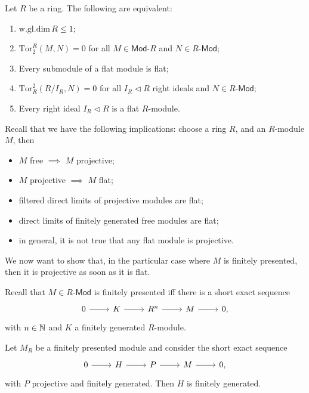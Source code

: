 \begin{prop}
	Let $R$ be a ring. The following are equivalent:
	\begin{enumerate}
		\item $\mathrm{w.gl.dim}\, R \leq 1$;
		\item $\mathrm{Tor}^R_2(M,N) = 0$ for all $M \in \mathsf{Mod}\text{-}R$ and $N \in R\text{-}\mathsf{Mod}$;
		\item Every submodule of a flat module is flat;
		\item $\mathrm{Tor}^2_R(R/I_R, N) = 0$ for all $I_R \triangleleft R$ right ideals
			and $N \in R\text{-}\mathsf{Mod}$;
		\item Every right ideal $I_R \triangleleft R$ is a flat $R$-module.
	\end{enumerate}
\end{prop} 

\begin{rem}[]
	Recall that we have the following implications:
	choose a ring $R$, and an $R$-module $M$, then
	\begin{itemize}
		\item $M$ free $\implies$ $M$ projective;
		\item $M$ projective $\implies$ $M$ flat;
		\item filtered direct limits of projective modules are flat;
		\item direct limits of finitely generated free modules are flat;
		\item in general, it is not true that any flat module is projective.
	\end{itemize}
	We now want to show that, in the particular case where $M$ is finitely presented, then
	it is projective as soon as it is flat.
\end{rem}

\begin{defn}
	Recall that $M \in R\text{-}\mathsf{Mod}$ is finitely presented iff
	there is a short exact sequence
	\begin{equation*}
	\begin{tikzcd}
		0 \arrow[r, "", rightarrow] &
		K \arrow[r, "", rightarrow] &
		R^n \arrow[r, "", rightarrow] &
		M \arrow[r, "", rightarrow] &
		0
	,\end{tikzcd}
	\end{equation*}
	with $n \in \mathbb{N}$ and $K$ a finitely generated $R$-module.
\end{defn}

\begin{lem}
	Let $M_R$ be a finitely presented module and consider the short exact sequence
	\begin{equation*}
	\begin{tikzcd}
		0 \arrow[r, "", rightarrow] &
		H \arrow[r, "", rightarrow] &
		P \arrow[r, "", rightarrow] &
		M \arrow[r, "", rightarrow] &
		0
	,\end{tikzcd}
	\end{equation*}
	with $P$ projective and finitely generated.
	Then $H$ is finitely generated.
\end{lem} 


